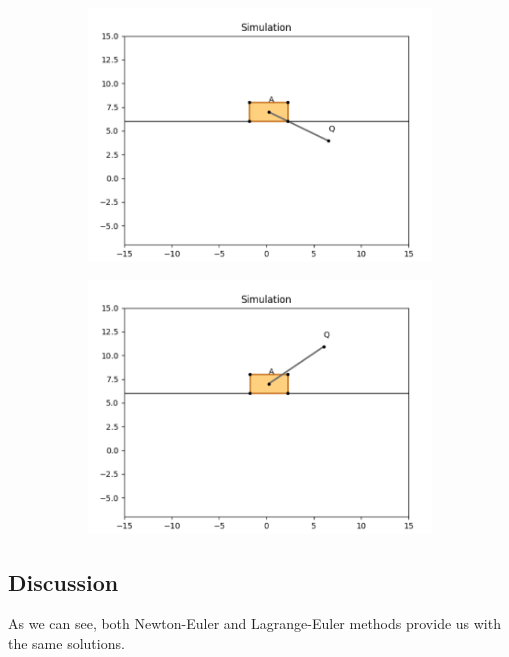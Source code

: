 \documentclass{article}
\begin{document}
\begin{figure}[htbp]
\begin{subfigure}[t]{0.45\linewidth}
    \includegraphics[width=\linewidth]{simulation/init3_3.png}
    \caption{}
  \end{subfigure}
  \begin{subfigure}[t]{0.45\linewidth}
    \centering
    \includegraphics[width=\linewidth]{simulation/init3_4.png}
    \caption{}
  \end{subfigure}
\end{figure}


\subsection{Discussion}
As we can see, both Newton-Euler and Lagrange-Euler methods provide us with the same solutions.
\end{document}
